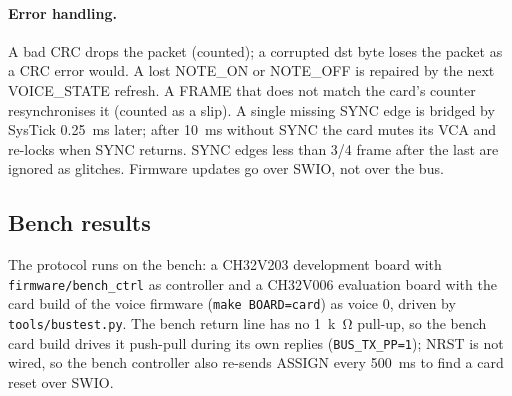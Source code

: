 \documentclass[11pt,a4paper]{article}
\newcommand{\file}[1]{\texttt{#1}}
\begin{document}
\paragraph{Error handling.} A bad CRC drops the packet (counted); a corrupted dst byte loses the packet as a CRC error
would. A lost NOTE\_ON or NOTE\_OFF is repaired by the next VOICE\_STATE refresh. A FRAME that does not match the
card's counter resynchronises it (counted as a slip). A single missing SYNC edge is bridged by SysTick \SI{0.25}{ms}
later; after \SI{10}{ms} without SYNC the card mutes its VCA and re-locks when SYNC returns. SYNC edges less than
3/4 frame after the last are ignored as glitches. Firmware updates go over SWIO, not over the bus.

\subsection{Bench results}\label{sec:benchbus}
The protocol runs on the bench: a CH32V203 development board with \file{firmware/bench\_ctrl} as controller and a
CH32V006 evaluation board with the card build of the voice firmware (\texttt{make BOARD=card}) as voice 0, driven by
\file{tools/bustest.py}. The bench return line has no \SI{1}{k\ohm} pull-up, so the bench card build drives it
push-pull during its own replies (\texttt{BUS\_TX\_PP=1}); NRST is not wired, so the bench controller also re-sends
ASSIGN every \SI{500}{ms} to find a card reset over SWIO.
\end{document}
